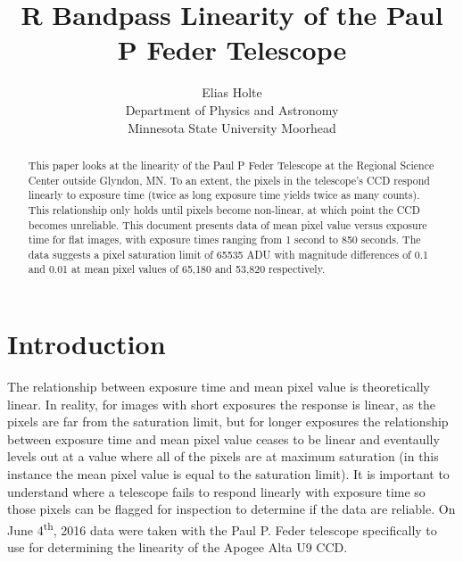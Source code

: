 \documentclass{article}
\begin{document}

\title{R Bandpass Linearity of the Paul P Feder Telescope}

\author{Elias Holte\\
	Department of Physics and Astronomy\\
	Minnesota State University Moorhead}

\maketitle

\begin{abstract}
This paper looks at the linearity of the Paul P Feder Telescope at the Regional Science Center outside Glyndon, MN. To an extent, the pixels in the telescope's CCD respond linearly to exposure time (twice as long exposure time yields twice as many counts). This relationship only holds until pixels become non-linear, at which point the CCD becomes unreliable. This document presents data of mean pixel value versus exposure time for flat images, with exposure times ranging from 1 second to 850 seconds. The data suggests a pixel saturation limit of 65535 ADU with magnitude differences of 0.1 and 0.01 at mean pixel values of 65,180 and 53,820 respectively.
\end{abstract}

\section{Introduction}
The relationship between exposure time and mean pixel value is theoretically linear. In reality, for images with short exposures the response is linear, as the pixels are far from the saturation limit, but for longer exposures the relationship between exposure time and mean pixel value ceases to be linear and eventaully levels out at a value where all of the pixels are at maximum saturation (in this instance the mean pixel value is equal to the saturation limit)\cite{howell06}. It is important to understand where a telescope fails to respond linearly with exposure time so those pixels can be flagged for inspection to determine if the data are reliable. On June 4\textsuperscript{th}, 2016 data were taken with the Paul P. Feder telescope specifically to use for determining the linearity of the Apogee Alta U9 CCD.
\end{document}
